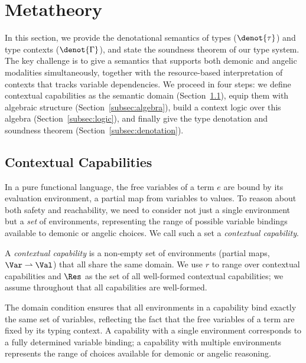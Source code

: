 \section{Metatheory}\label{sec:meta}

In this section, we provide the denotational semantics of types
($\denot{\tau}$) and type contexts ($\denot{\Gamma}$), and state the
soundness theorem of our type system.  The key challenge is to give a
semantics that supports both demonic and angelic modalities
simultaneously, together with the resource-based interpretation of
contexts that tracks variable dependencies.  We proceed in four
steps: we define contextual capabilities as the semantic domain
(Section~\ref{subsec:capabilities}), equip them with algebraic structure
(Section~\ref{subsec:algebra}), build a context logic over this algebra
(Section~\ref{subsec:logic}), and finally give the type denotation and
soundness theorem (Section~\ref{subsec:denotation}).

\subsection{Contextual Capabilities}\label{subsec:capabilities}

In a pure functional language, the free variables of a term $e$ are
bound by its evaluation environment, a partial map from variables to
values.  To reason about both safety and reachability, we need to
consider not just a single environment but a \emph{set} of
environments, representing the range of possible variable bindings
available to demonic or angelic choices.  We call such a set a
\emph{contextual capability}.

\begin{definition}\label{def:contextual-capability}
  A \emph{contextual capability} is a non-empty set of environments
  (partial maps, $\Var \rightharpoonup \Val$) that all share the same
  domain.  We use $r$ to range over contextual capabilities and $\Res$
  as the set of all well-formed contextual capabilities; we assume
  throughout that all capabilities are well-formed.
\end{definition}

The domain condition ensures that all environments in a capability
bind exactly the same set of variables, reflecting the fact that the
free variables of a term are fixed by its typing context.  A
capability with a single environment corresponds to a fully determined
variable binding; a capability with multiple environments represents
the range of choices available for demonic or angelic reasoning.

